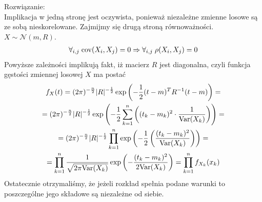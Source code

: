 Rozwiązanie:\\
Implikacja w jedną stronę jest oczywista, ponieważ niezależne zmienne losowe są ze sobą nieskorelowane. Zajmijmy się drugą stroną równoważności. $ X\sim\mathcal N(m,R) $.
\begin{gather*}
\forall_{i,j}\;\text{cov}(X_i,X_j)=0\Rightarrow
\forall_{i,j}\;\rho(X_i,X_j)=0
\end{gather*}
Powyższe zależności implikują fakt, iż macierz $ R $ jest diagonalna, czyli funkcja gęstości zmiennej losowej $ X $ ma postać
\begin{gather*}
f_X(t)=
(2\pi)^{-\frac{n}{2}}|R|^{-\frac{1}{2}}
\exp\left(-\frac{1}{2}(t-m)^TR^{-1}(t-m)\right)
=\\=
(2\pi)^{-\frac{n}{2}}|R|^{-\frac{1}{2}}
\exp\left(-\frac{1}{2}\sum_{k=1}^{n}\left((t_k-m_k)^2\cdot \frac{1}{\text{Var}(X_k)}\right)\right)
=\\=
(2\pi)^{-\frac{n}{2}}|R|^{-\frac{1}{2}}
\prod_{k=1}^{n}\exp\left(-\frac{1}{2}\left(\frac{(t_k-m_k)^2}{\text{Var}(X_k)}\right)\right)
=\\=
\prod_{k=1}^{n}\frac{1}{\sqrt{2\pi\text{Var}(X_k)}}\exp\left(-\frac{(t_k-m_k)^2}{2\text{Var}(X_k)}\right)=\prod_{k=1}^{n}f_{X_k}(x_k)
\end{gather*}
Ostatecznie otrzymaliśmy, że jeżeli rozkład spełnia podane warunki to poszczególne jego składowe są niezależne od siebie.